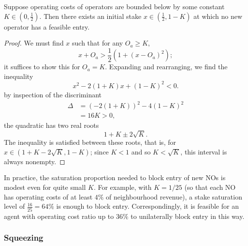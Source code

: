 \begin{corollary*}

  Suppose operating costs of operators are bounded below by some constant $K\in(0,\frac{1}{2})$.
  Then there exists an initial stake $x\in(\frac{1}{2},1-K)$ at which no new operator has a feasible entry.

\end{corollary*}
%
\begin{proof}

  We must find $x$ such that for any $O_a\geq K$,
  \[
    x + O_a > \frac{1}{2}(1 + (x-O_a)^2);
  \]
  it suffices to show this for $O_a=K$.
  Expanding and rearranging, we find the inequality
  \[
    x^2 - 2(1+K) x + (1-K)^2 < 0.
  \]
  by inspection of the discriminant
  \begin{align*}
    \Delta &= (-2(1+K))^2 - 4(1-K)^2 \\
    &= 16K > 0,
  \end{align*}
  the quadratic has two real roots
  \[
    1 + K \pm 2\sqrt{K}.
  \]
  The inequality is satisfied between these roots, that is, for $x \in ( 1+K-2\sqrt{K}, 1-K)$; since $K<1$ and so $K<\sqrt{K}$, this interval is always nonempty. \qedhere

\end{proof}

\begin{example}

  In practice, the saturation proportion needed to block entry of new NOs is modest even for quite small $K$.
  For example, with $K=1/25$ (so that each NO has operating costs of at least $4\%$ of neighbourhood revenue), a stake saturation level of $\frac{16}{25}=64\%$ is enough to block entry.
  Correspondingly, it is feasible for an agent with operating cost ratio up to $36\%$ to unilaterally block entry in this way.

\end{example}


\subsubsection{Squeezing}


